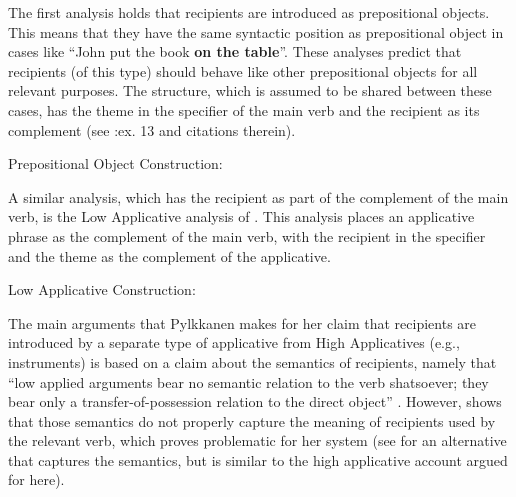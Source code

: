 The first analysis holds that recipients are introduced as prepositional objects. This means that they have the same syntactic position as prepositional object in cases like ``John put the book \textbf{on the table}''. These analyses predict that recipients (of this type) should behave like other prepositional objects for all relevant purposes. The structure, which is assumed to be shared between these cases, has the theme in the specifier of the main verb and the recipient as its complement (see \citealt{Larson.1988}:ex. 13 and citations therein).

\begin{exe}
	\ex Prepositional Object Construction:\label{ex:POC} \\
\end{exe}


A similar analysis, which has the recipient as part of the complement of the main verb, is the Low Applicative analysis of \cite{Pylkkanen.2001}. This analysis places an applicative phrase as the complement of the main verb, with the recipient in the specifier and the theme as the complement of the applicative. 
\begin{exe}
\ex Low Applicative Construction: \\
\end{exe}


The main arguments that Pylkkanen makes for her claim that recipients are introduced by a separate type of applicative from High Applicatives (e.g., instruments) is based on a claim about the semantics of recipients, namely that ``low applied arguments bear no semantic relation to the verb shatsoever; they bear only a transfer-of-possession relation to the direct object'' \citep{Pylkkanen.2008}. However, \cite{Larson.2010} shows that those semantics do not properly capture the meaning of recipients used by the relevant verb, which proves problematic for her system (see \citealt{Georgala.2012} for an alternative that captures the semantics, but is similar to the high applicative account argued for here).


